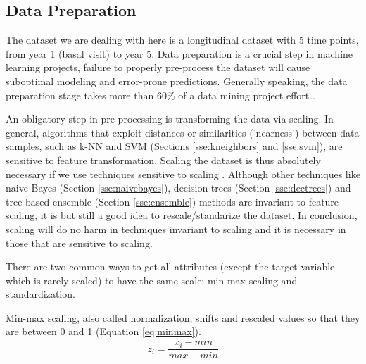 \documentclass[11pt]{article}
\theoremstyle{definition}
\theoremstyle{remark}
\begin{document}
\subsection{Data Preparation} 
\label{sse:dp}
  
The dataset we are dealing with here is a longitudinal dataset with 5 time points, from year 1 (basal visit) to year 5.
Data preparation is a crucial step in machine learning projects, failure to properly pre-process the dataset will cause suboptimal modeling and error-prone predictions.
Generally speaking, the data preparation stage takes more than $60\%$ of a data mining project effort \cite{witten2005data}.

An obligatory step in pre-processing is transforming the data via scaling. 
In general, algorithms that exploit distances or similarities ('nearness') between data samples, such as k-NN and SVM (Sections \ref{sse:kneighbors} and \ref{sse:svm}), are sensitive to feature transformation. 
Scaling the dataset is thus absolutely necessary if we use techniques sensitive to scaling \cite{wu2012foundations}. Although other techniques like naive Bayes (Section \ref{sse:naivebayes}), decision trees (Section \ref{sse:dectrees}) and tree-based ensemble (Section \ref{sse:ensemble}) methods are invariant to feature scaling, it is but still a good idea to rescale/standarize the dataset. In conclusion, scaling will do no harm in techniques invariant to scaling and it is necessary in those that are sensitive to scaling. 

There are two common ways to get all attributes (except the target variable which is rarely scaled) to have the same scale: min-max scaling and standardization.

Min-max scaling, also called normalization, shifts and rescaled values so that they are between 0 and 1 (Equation \ref{eq:minmax}). 
\begin{equation} \label{eq:minmax}
z_i = \frac{x_i -min}{max -min}
\end{equation}
\end{document}
